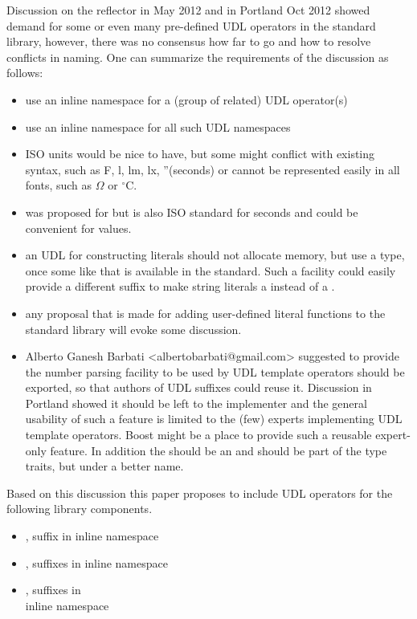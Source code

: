 \documentclass[ebook,11pt,article]{memoir}
\begin{document}
Discussion on the reflector in May 2012 and in Portland Oct 2012 showed demand for some or even many pre-defined UDL operators in the standard library, however, there was no consensus how far to go and how to resolve conflicts in naming. One can summarize the requirements of the discussion as follows:
\begin{itemize}
\item use an inline namespace for a (group of related) UDL operator(s)
\item use an inline namespace  for all such UDL namespaces
\item ISO units would be nice to have, but some might conflict with existing syntax, such as F, l, lm, lx, ''(seconds) or cannot be represented easily in all fonts, such as $\Omega$ or $^{\circ}\mathrm{C}$.
\item {} was proposed for  but is also ISO standard for seconds and could be convenient for  values.
\item an UDL for constructing  literals should not allocate memory, but use a  type, once some like that is available in the standard. Such a facility could easily provide a different suffix to make string literals a  instead of a .
\item any proposal that is made for adding user-defined literal functions to the standard library will evoke some discussion.
\item Alberto Ganesh Barbati <albertobarbati@gmail.com> suggested to provide the number parsing facility to be used by UDL template operators should be exported, so that authors of UDL suffixes could reuse it. Discussion in Portland showed it should be left to the implementer and the general usability of such a feature is limited to the (few) experts implementing UDL template operators. Boost might be a place to provide such a reusable expert-only feature. In addition the  should be an  and should be part of the type traits, but under a better name.
\end{itemize}

Based on this discussion this paper proposes to include UDL operators for the following library components.
\begin{itemize}
\item {}, suffix  in inline namespace 
\item {}, suffixes  in inline namespace 
\item {}, suffixes  in \\inline namespace 
\end{itemize}
\end{document}
